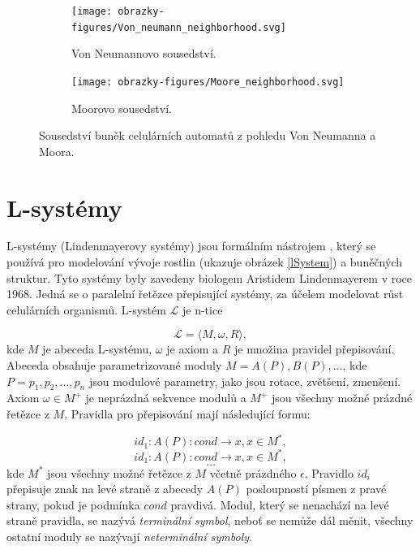 \begin{figure}[h]
	\centering
	\begin{subfigure}{0.475\textwidth}
		\centering
		\texttt{[image: obrazky-figures/Von\_neumann\_neighborhood.svg]}
		\caption{Von Neumannovo sousedství.}
		\label{vonNeumann}
	\end{subfigure}
	\begin{subfigure}{0.475\textwidth}
		\centering
		\texttt{[image: obrazky-figures/Moore\_neighborhood.svg]}
		\caption{Moorovo sousedství.}
		\label{moore}
	\end{subfigure}
	\caption{Sousedství buněk celulárních automatů z pohledu Von Neumanna a Moora.}
\end{figure}

\section{L-systémy}
\label{lsystems}
L-systémy (Lindenmayerovy systémy) jsou formálním nástrojem \cite{prusinkiewicz1986graphical}, který se používá pro modelování vývoje rostlin (ukazuje obrázek \ref{lSystem}) a buněčných struktur. Tyto systémy byly zavedeny biologem Aristidem Lindenmayerem v roce 1968. \cite{inverseL-systems} Jedná se o paralelní řetězce přepisující systémy, za účelem modelovat růst celulárních organismů. L-systém $\mathcal{L}$ je n-tice

\begin{equation}
	\mathcal{L} = \langle M,\omega,R\rangle ,
\end{equation}
kde $M$ je abeceda L-systému, $\omega$ je axiom a $R$ je množina pravidel přepisování. Abeceda obsahuje parametrizované moduly $M = {A(P),B(P),\ldots}$, kde $P=p_1,p_2,\ldots,p_n$ jsou modulové parametry, jako jsou rotace, zvětšení, zmenšení.
Axiom $\omega \in M^+$ je neprázdná sekvence modulů a $M^+$ jsou všechny možné prázdné řetězce z $M$. Pravidla pro přepisování mají následující formu:

\[id_1:A(P):cond\rightarrow x,x \in M^*,\]
\begin{equation}
id_1:A(P):cond\rightarrow x,x \in M^*,
\end{equation}
\[\ldots\]
kde $M^*$ jsou všechny možné řetězce z $M$ včetně prázdného $\epsilon$. Pravidlo $id_i$ přepisuje znak na levé straně z abecedy $A(P)$ posloupností písmen z pravé strany, pokud je podmínka $cond$ pravdivá. Modul, který se nenachází na levé straně pravidla, se nazývá \textit{terminální symbol}, neboť se nemůže dál měnit, všechny ostatní moduly se nazývají \textit{neterminální symboly}.~\cite{prusinkiewicz2012algorithmic}

